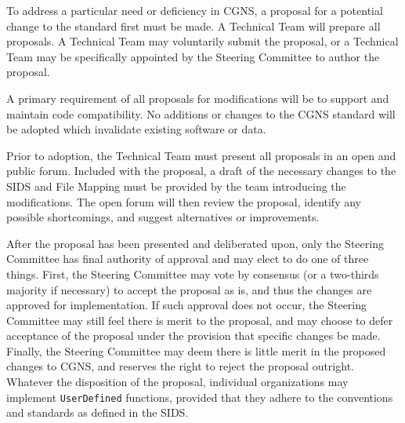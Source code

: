To address a particular need or deficiency in CGNS, a proposal for a
potential change to the standard first must be made.
A Technical Team will prepare all proposals.
A Technical Team may voluntarily submit the proposal, or a Technical
Team may be specifically appointed by the Steering Committee to author
the proposal.

A primary requirement of all proposals for modifications will be to
support and maintain code compatibility.
No additions or changes to the CGNS standard will be adopted which
invalidate existing software or data.

Prior to adoption, the Technical Team must present all proposals in
an open and public forum.
Included with the proposal, a draft of the necessary changes to the
SIDS and File Mapping must be provided by the team introducing the
modifications.
The open forum will then review the proposal, identify any possible
shortcomings, and suggest alternatives or improvements.

After the proposal has been presented and deliberated upon, only the
Steering Committee has final authority of approval and may elect to
do one of three things.
First, the Steering Committee may vote by consensus (or a two-thirds
majority if necessary) to accept the proposal as is, and thus the
changes are approved for implementation.
If such approval does not occur, the Steering Committee may still feel
there is merit to the proposal, and may choose to defer acceptance of
the proposal under the provision that specific changes be made.
Finally, the Steering Committee may deem there is little merit in the
proposed changes to CGNS, and reserves the right to reject the proposal
outright.
Whatever the disposition of the proposal, individual organizations may
implement \texttt{UserDefined} functions, provided that they adhere to
the conventions and standards as defined in the SIDS.
